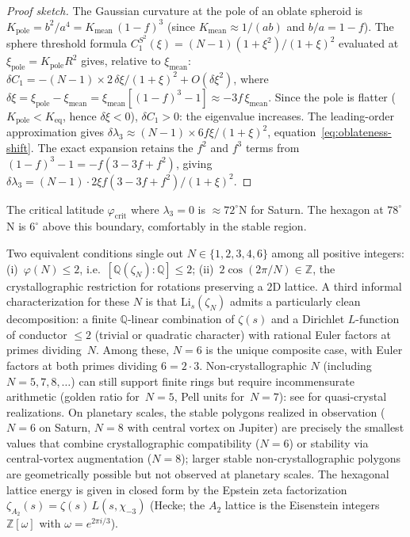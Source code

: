 \begin{proof}[Proof sketch]
The Gaussian curvature at the pole of an oblate spheroid
is $K_{\mathrm{pole}} = b^2/a^4
= K_{\mathrm{mean}}\,(1{-}f)^3$
(since $K_{\mathrm{mean}} \approx 1/(ab)$
and $b/a = 1{-}f$).
The sphere threshold formula
$C_1^{S^2}(\xi) = (N{-}1)(1{+}\xi^2)/(1{+}\xi)^2$
evaluated at $\xi_{\mathrm{pole}} = K_{\mathrm{pole}} R^2$
gives, relative to $\xi_{\mathrm{mean}}$:
$\delta C_1 = -(N{-}1) \times 2\,\delta\xi/(1{+}\xi)^2
+ O(\delta\xi^2)$,
where $\delta\xi = \xi_{\mathrm{pole}} - \xi_{\mathrm{mean}}
= \xi_{\mathrm{mean}}[(1{-}f)^3 - 1]
\approx -3f\,\xi_{\mathrm{mean}}$.
Since the pole is flatter ($K_{\mathrm{pole}} < K_{\mathrm{eq}}$,
hence $\delta\xi < 0$),
$\delta C_1 > 0$: the eigenvalue increases.
The leading-order approximation gives
$\delta\lambda_3 \approx (N{-}1) \times 6f\xi/(1{+}\xi)^2$,
equation~\eqref{eq:oblateness-shift}.
The exact expansion retains the $f^2$ and $f^3$ terms
from $(1{-}f)^3 - 1 = -f(3 - 3f + f^2)$,
giving
$\delta\lambda_3 = (N{-}1) \cdot 2\xi f(3 - 3f + f^2)/(1{+}\xi)^2$.
\end{proof}

\noindent
The critical latitude $\varphi_{\mathrm{crit}}$ where $\lambda_3 = 0$
is $\approx 72^\circ$N for Saturn.
The hexagon at $78^\circ$N is $6^\circ$ above this boundary, comfortably
in the stable region.

\begin{remark}[Crystallographic uniqueness of $N = 6$]
\label{rem:crystallographic-N6}
Two equivalent conditions single out $N \in \{1, 2, 3, 4, 6\}$
among all positive integers:
(i)~$\varphi(N) \le 2$, i.e.\ $[\mathbb{Q}(\zeta_N):\mathbb{Q}] \le 2$;
(ii)~$2\cos(2\pi/N) \in \mathbb{Z}$, the crystallographic
restriction for rotations preserving a $2$D lattice.
A third informal characterization for these $N$ is that
$\mathrm{Li}_s(\zeta_N)$ admits a particularly clean decomposition:
a finite $\mathbb{Q}$-linear combination of $\zeta(s)$ and a
Dirichlet $L$-function of conductor $\le 2$ (trivial or quadratic
character) with rational Euler factors at primes dividing~$N$.
Among these, $N = 6$ is the unique composite case, with
Euler factors at both primes dividing $6 = 2 \cdot 3$.
Non-crystallographic $N$ (including $N = 5, 7, 8, \ldots$)
can still support finite rings but require incommensurate
arithmetic (golden ratio for~$N = 5$, Pell units for~$N = 7$):
see \citealt*{Shechtman1984} for quasi-crystal realizations.
On planetary scales, the stable polygons realized in
observation ($N = 6$ on Saturn, $N = 8$ with central vortex
on Jupiter) are precisely the smallest values that combine
crystallographic compatibility ($N = 6$) or stability via
central-vortex augmentation ($N = 8$); larger stable
non-crystallographic polygons are geometrically possible
but not observed at planetary scales.
The hexagonal lattice energy is given in closed form by the
Epstein zeta factorization
$\zeta_{A_2}(s) = \zeta(s)\,L(s, \chi_{-3})$
(Hecke; the $A_2$ lattice is the Eisenstein integers
$\mathbb{Z}[\omega]$ with $\omega = e^{2\pi i/3}$).
\end{remark}

